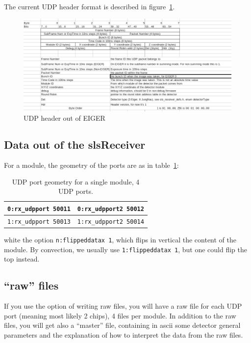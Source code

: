\documentclass{article}
\begin{document}
The current UDP header format is described in figure~\ref{UDPheader}.
\begin{figure}[t]
\begin{center}
\includegraphics[width=1.2\textwidth]{EIGERUDPHeader}
\end{center}
\caption{UDP header out of EIGER}
\label{UDPheader}
\end{figure}
 
\subsection{Data out of the slsReceiver}


For a module, the geometry of the ports are as in table~\ref{tports}: 
\begin{table}
\begin{tabular}{|c|c|}
\hline
{\tt{0:rx\_udpport 50011}} &  {\tt{0:rx\_udpport2 50012}}\\  
\hline
{\tt{1:rx\_udpport 50013}} &  {\tt{1:rx\_udpport2 50014}}\\  
\hline
\end{tabular}
\caption{UDP port geometry for a single module, 4 UDP ports.}
\label{tports}
\end{table}
white the option {\tt{n:flippeddatax 1}}, which flips in vertical the content of the module. By convection, we usually use {\tt{1:flippeddatax 1}}, but one could flip the top instead.


\subsection{``raw'' files}
If you use the option of writing raw files, you will have a raw file for each UDP port (meaning most likely 2 chips), 4 files per module. In addition to the raw files, you will get also a ``master'' file, containing in ascii some detector general parameters and the explanation of how to interpret the data from the raw files.
   
\end{document}
